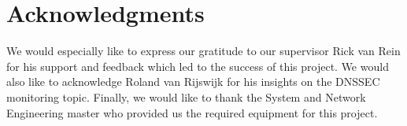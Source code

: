 \section*{Acknowledgments}
\label{chap:acknowledgments}
We would especially like to express our gratitude to our supervisor Rick van Rein for his support and feedback which led to the success of this project. We would also like to acknowledge Roland van Rijswijk for his insights on the DNSSEC monitoring topic. Finally, we would like to thank the System and Network Engineering master who provided us the required equipment for this project.